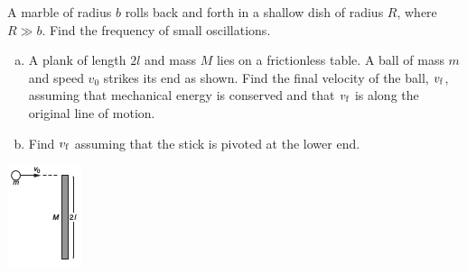 \documentclass[12pt,letterpaper]{hmcpset}
\begin{document}
\begin{problem}
A marble of radius $b$ rolls back and forth in a shallow dish of radius $R$,
where $R \gg b$. Find the frequency of small oscillations.
\end{problem}
\begin{solution}
    \vfill
\end{solution}
\clearpage

\begin{problem}
\begin{enumerate}[(a)]
\item A plank of length $2l$ and mass $M$ lies on a frictionless table. A
ball of mass $m$ and speed $v_{0}$ strikes its end as shown. Find the final
velocity of the ball, $v_{\rm f}$, assuming that mechanical energy is
conserved and that $v_{\rm f}$ is along the original line of motion.
\item Find $v_{\rm f}$ assuming that the stick is pivoted at the lower end.
\end{enumerate}
\begin{center}
    \includegraphics{img/7_37}
\end{center}
\end{problem}
\begin{solution}
    \vfill
\end{solution}
\clearpage
\end{document}
